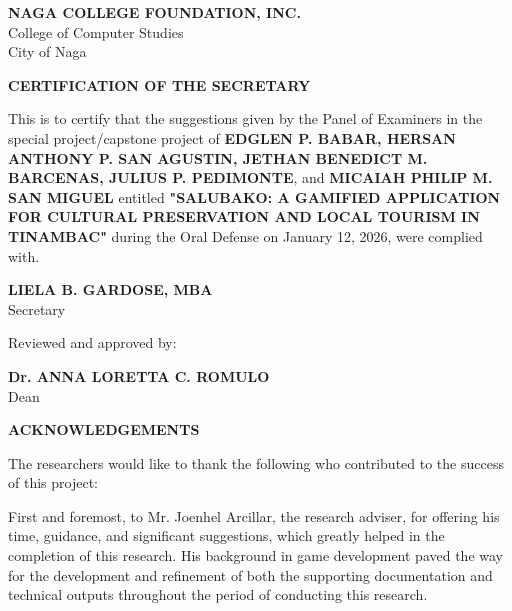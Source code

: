 \documentclass[11pt]{research}
\begin{document}
\begin{center}
{\large \textbf{NAGA COLLEGE FOUNDATION, INC.}} \\[0.3em]
College of Computer Studies \\[0.2em]
City of Naga

\vspace{1.5cm}

{\large \textbf{CERTIFICATION OF THE SECRETARY}}
\end{center}

\vspace{1cm}

\hspace{0.5cm} This is to certify that the suggestions given by the Panel of Examiners in the special project/capstone project of \textbf{EDGLEN P. BABAR, HERSAN ANTHONY P. SAN AGUSTIN, JETHAN BENEDICT M. BARCENAS, JULIUS P. PEDIMONTE}, and \textbf{MICAIAH PHILIP M. SAN MIGUEL} entitled \textbf{"SALUBAKO: A GAMIFIED APPLICATION FOR CULTURAL PRESERVATION AND LOCAL TOURISM IN TINAMBAC"} during the Oral Defense on January 12, 2026, were complied with.

\vspace{2.5cm}

\begin{flushright}
\textbf{LIELA B. GARDOSE, MBA} \\ Secretary
\end{flushright}

\vspace{1.5cm}

\noindent
Reviewed and approved by:

\noindent
\textbf{Dr. ANNA LORETTA C. ROMULO} \\
\hspace{2in} Dean
\clearpage

\begin{center}
{\large \textbf{ACKNOWLEDGEMENTS}}
\end{center}

The researchers would like to thank the following who contributed to the success of this project:

First and foremost, to Mr. Joenhel Arcillar, the research adviser, for offering his time, guidance, and significant suggestions, which greatly helped in the completion of this research. His background in game development paved the way for the development and refinement of both the supporting documentation and technical outputs throughout the period of conducting this research.
\end{document}
